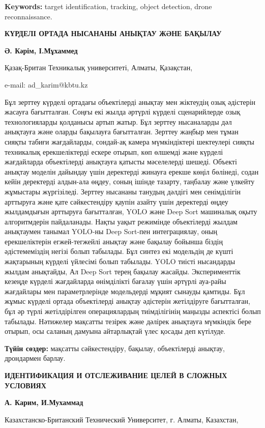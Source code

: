 \textbf{Keywords:} target identification, tracking, object detection,
drone reconnaissance.

\textbf{КҮРДЕЛІ ОРТАДА НЫСАНАНЫ АНЫҚТАУ ЖӘНЕ БАҚЫЛАУ}

\textbf{Ә. Кәрім, І.Мұхаммед}

Қазақ-Британ Техникалық университеті, Алматы, Қазақстан,

e-mail: ad\_karim@kbtu.kz

Бұл зерттеу күрделі ортадағы объектілерді анықтау мен жіктеудің озық
әдістерін жасауға бағытталған. Соңғы екі жылда әртүрлі күрделі
сценарийлерде озық технологияларды қолданысы артып жатыр. Бұл зерттеу
нысаналарды дәл анықтауға және оларды бақылауға бағытталған. Зерттеу
жаңбыр мен тұман сияқты табиғи жағдайларды, сондай-ақ камера
мүмкіндіктері шектеулері сияқты техникалық ерекшеліктерді ескере отырып,
көп өлшемді және күрделі жағдайларда объектілерді анықтауға қатысты
мәселелерді шешеді. Объекті анықтау моделін дайындау үшін деректерді
жинауға ерекше көңіл бөлінеді, содан кейін деректерді алдын-ала өңдеу,
соның ішінде тазарту, таңбалау және үлкейту жұмыстары жүргізіледі.
Зерттеу нысананы танудың дәлдігі мен сенімділігін арттыруға және қате
сәйкестендіру қаупін азайту үшін деректерді өңдеу жылдамдығын арттыруға
бағытталған, YOLO және Deep Sort машиналық оқыту алгоритмдерін
пайдаланады. Нақты уақыт режимінде объектілерді жылдам анықтаумен
танымал YOLO-ны Deep Sort-пен интеграциялау, оның ерекшеліктерін
егжей-тегжейлі анықтау және бақылау бойынша біздің әдістемеміздің негізі
болып табылады. Бұл синтез екі модельдің де күшті жақтарының күрделі
үйлесімі болып табылады. YOLO тиісті нысандарды жылдам анықтайды, Ал
Deep Sort терең бақылау жасайды. Эксперименттік кезеңде күрделі
жағдайларда өнімділікті бағалау үшін әртүрлі ауа-райы жағдайлары мен
параметрлерінде модельдерді мұқият сынауды қамтиды. Бұл жұмыс күрделі
ортада объектілерді анықтау әдістерін жетілдіруге бағытталған, бұл әр
түрлі жетілдірілген операциялардың тиімділігінің маңызды аспектісі болып
табылады. Нәтижелер мақсатты тезірек және дәлірек анықтауға мүмкіндік
бере отырып, осы саланың дамуына айтарлықтай үлес қосады деп күтілуде.

\textbf{Түйін сөздер:} мақсатты сәйкестендіру, бақылау, объектілерді
анықтау, дрондармен барлау.

\textbf{ИДЕНТИФИКАЦИЯ И ОТСЛЕЖИВАНИЕ ЦЕЛЕЙ В СЛОЖНЫХ УСЛОВИЯХ}

\textbf{А. Карим, И.Мухаммад}

Казахстанско-Британский Технический Университет, г. Алматы, Казахстан,

